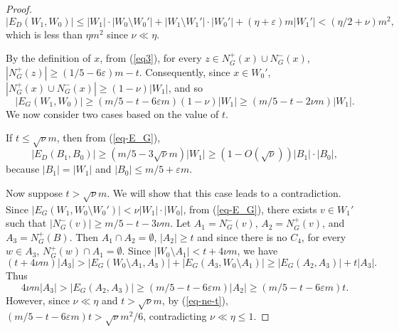 \documentclass[10pt,a4paper]{amsart}
\renewcommand{\epsilon}{{\varepsilon}}
\begin{document}
\begin{proof}
$$|E_D(W_1, W_0)|\leq |W_1|\cdot|W_0\setminus W_0'|+|W_1\setminus W_1'|\cdot |W_0'|+ (\eta+\epsilon)m|W_1'|< (\eta/2 +\nu)m^2,$$
which is less than $\eta m^2$ since $\nu \ll \eta$. 

By the definition of $x$, from (\ref{eq3}), for every $z\in N^+_{G}(x)\cup N^-_{G}(x)$,  $|N^+_{G}(z)|\geq (1/5-6\epsilon)m- t.$ 
Consequently, since $x\in W_0'$, $|N^+_{G}(x)\cup N^-_{G}(x)|\geq (1-\nu)|W_1|$, and so
\begin{equation}\label{eq-E_G}
    |E_{G}(W_1, W_0)|\geq (m/5-t -6\epsilon m)(1-\nu)|W_1|\geq (m/5- t-2\nu m)|W_1|.
\end{equation}
We now consider two cases based on the value of $t$.

If $t\leq \sqrt{\nu}m$, then from (\ref{eq-E_G}), 
$$|E_D(B_1, B_0)|\geq (m/5- 3\sqrt{\nu} m)|W_1|\geq (1- O(\sqrt{\nu}))|B_1|\cdot |B_0|,$$
because $|B_1|=|W_1|$ and $|B_0|\leq m/5+\epsilon m$.

Now suppose $t>\sqrt{\nu}m$. We will show that this case leads to a contradiction. Since $|E_G(W_1, W_0\setminus W_0')|<\nu |W_1|\cdot |W_0|$, from (\ref{eq-E_G}), there exists $v\in W_1'$ such that $|N_G^-(v)|\geq m/5 -t -3\nu m$. Let $A_1= N^-_G(v)$, $A_2=N^+_G(v)$, and $A_3=N^+_G(B)$. Then $A_1\cap A_2=\emptyset$, $|A_2|\geq t $ and since there is no $C_4$, for every $w\in A_3$, $N^+_G(w)\cap A_1=\emptyset$. Since $|W_0\setminus A_1|<t+4\nu m$, we have
$$(t+4\nu m)|A_3|> |E_G(W_0\setminus A_1, A_3)|+ |E_G(A_3, W_0\setminus A_1)|\geq |E_G(A_2, A_3)|+t|A_3|.$$
 Thus
 $$4\nu m |A_3|> |E_G(A_2,A_3)|\geq (m/5-t-6\epsilon m)|A_2|\geq (m/5-t-6\epsilon m)t.$$
However, since $\nu \ll \eta$ and $t>\sqrt{\nu}m$, by (\ref{eq-ne-t}),
$(m/5-t-6\epsilon m)t> \sqrt{\nu} m^2/6$, contradicting $\nu \ll \eta \leq 1$.

\end{proof}
\end{document}
